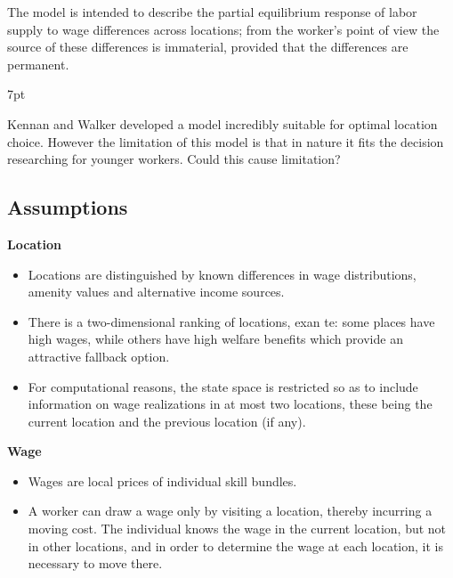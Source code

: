 \documentclass{article}
\newenvironment{greenblock}{%
\def\FrameCommand{%
  \hspace{1pt}%
    {\color{Green}%
    \vrule width 2pt}%
    {\color{greenshade}%
    \vrule width 4pt}%
  \colorbox{greenshade}%
}%
\MakeFramed{%
  \advance%
  \hsize-%
  \width%
  \FrameRestore}%
\noindent\hspace{-4.55pt}%
\begin{adjustwidth}{}{7pt}%
\vspace{2pt}\vspace{2pt}%
}
{%
\vspace{2pt}\end{adjustwidth}\endMakeFramed%
}
\numberwithin{equation}{section} %
\begin{document}
The model is intended to describe the partial equilibrium response of labor supply to wage differences across locations; from the worker’s point of view the source of these differences is immaterial, provided that the differences are permanent.

\begin{greenblock}
Kennan and Walker developed a model incredibly suitable for optimal location choice. However the limitation of this model is that in nature it fits the decision researching for younger workers. Could this cause limitation?
\end{greenblock}

\subsection{Assumptions} %

\textbf{Location}
\begin{itemize}
  \item Locations are distinguished by known differences in wage distributions, amenity values and alternative income sources. 
  \item There is a two-dimensional ranking of locations, exan te: some places have high wages, while others have high welfare benefits which provide an attractive fallback option.
  \item For computational reasons, the state space is restricted so as to include information on wage realizations in at most two locations, these being the current location and the previous location (if any).
\end{itemize}

\textbf{Wage}
\begin{itemize}
  \item Wages are local prices of individual skill bundles. 
  \item A worker can draw a wage only by visiting a location, thereby incurring a moving cost. The individual knows the wage in the current location, but not in other locations, and in order to determine the wage at each location, it is necessary to move there.
\end{itemize}
\end{document}
